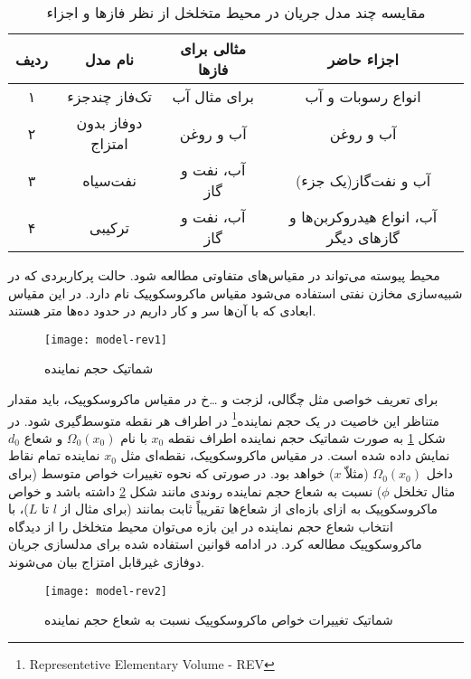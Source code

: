\begin{table}
\centering
\caption{مقایسه چند مدل جریان در محیط متخلخل از نظر فازها و اجزاء}
\label{tab:2model}
\begin{tabular}{|c|c|c|c|}
\hline
ردیف &نام مدل &مثالی برای فاز‌ها &اجزاء حاضر  \\
\hline
۱ &تک‌فاز چند‌جزء &برای مثال آب  &انواع رسوبات و آب \\
۲ &دو‌فاز بدون امتزاج &آب و روغن &آب و روغن  \\
۳ &نفت‌سیاه &آب، نفت و گاز &آب و نفت‌گاز(یک جزء)  \\
۴ &ترکیبی &آب، نفت و گاز &آب، انواع هیدروکربن‌ها و گاز‌های دیگر  \\
\hline
\end{tabular}
\end{table}

محیط پیوسته می‌تواند در مقیاس‌های متفاوتی مطالعه شود. حالت پرکاربردی که در شبیه‌سازی مخازن نفتی استفاده می‌شود مقیاس ماکروسکوپیک  نام دارد. در این مقیاس ابعادی که با آن‌ها سر و کار داریم در حدود ده‌ها متر هستند.
\begin{figure}
\texttt{[image: model-rev1]}
\caption{شماتیک حجم نماینده}
\label{fig:2rev1}
\end{figure}


 برای تعریف خواصی مثل چگالی، لزجت و \dots‌خ{} در  مقیاس ماکروسکوپیک، باید مقدار متناظر این خاصیت در یک حجم نماینده\footnote{Representetive Elementary Volume - REV} در اطراف هر نقطه متوسط‌گیری شود. در شکل \ref{fig:2rev1} به صورت شماتیک حجم نماینده اطراف نقطه $x_0$ با نام
 $\Omega_0(x_0)$
 و شعاع $d_0$ نمایش داده شده است. در مقیاس ماکروسکوپیک، نقطه‌ای مثل $x_0$ نماینده تمام نقاط داخل 
 $\Omega_0(x_0)$
(مثلاّ $x$) خواهد بود. در صورتی که نحوه تغییرات خواص متوسط (برای مثال تخلخل $\phi$) نسبت به شعاع حجم نماینده روندی مانند شکل \ref{fig:2rev2}  داشته باشد و خواص ماکروسکوپیک به ازای بازه‌ای از شعاع‌ها تقریباً ثابت بمانند (برای مثال از $l$ تا $L$)، با انتخاب شعاع حجم نماینده در این بازه می‌توان محیط متخلخل را از دیدگاه ماکروسکوپیک مطالعه کرد. در ادامه قوانین استفاده شده برای مدلسازی جریان دوفازی غیر‌قابل امتزاج بیان می‌شوند.

\begin{figure}[h]
\texttt{[image: model-rev2]}
\caption{شماتیک تغییرات خواص ماکروسکوپیک نسبت به شعاع حجم نماینده}
\label{fig:2rev2}
\end{figure}
